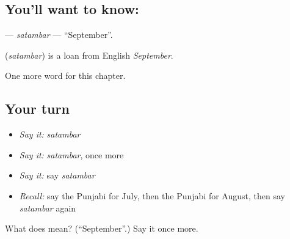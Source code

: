 \subsection*{You'll want to know: }
\textbf{} — \emph{satambar} — \textquotedblleft{}September\textquotedblright{}.

\begin{cousinweb}
\textbf{} (\emph{satambar}) is a loan from English \emph{September}.
\end{cousinweb}

\begin{grammarlens}[title={What you've built}]
One more word for this chapter.
\end{grammarlens}

\subsection*{Your turn}
\begin{itemize}
\raggedright
  \item \emph{Say it:} \emph{satambar}
  \item \emph{Say it:} \emph{satambar}, once more
  \item \emph{Say it:} say \emph{satambar}
  \item \emph{Recall:} say the Punjabi for July, then the Punjabi for August, then say \emph{satambar} again
\end{itemize}

\begin{tcolorbox}[breakable,colback=teal!4,colframe=teal!35!black,title={Before you move on}]
What does  mean? (\textquotedblleft{}September\textquotedblright{}.) Say it once more.
\end{tcolorbox}
